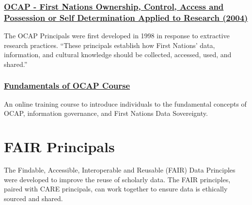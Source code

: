 \documentclass[
]{book}
\begin{document}
\hypertarget{ocap---first-nations-ownership-control-access-and-possession-or-self-determination-applied-to-research-2004}{%
\subsubsection*{\texorpdfstring{\href{https://biblio.uottawa.ca/sites/biblio.uottawa.ca/files/bestpractices_fnigc_ocap_fact_sheet_en_final.pdf}{OCAP - First Nations Ownership, Control, Access and Possession or Self Determination Applied to Research (2004)}}{OCAP - First Nations Ownership, Control, Access and Possession or Self Determination Applied to Research (2004)}}\label{ocap---first-nations-ownership-control-access-and-possession-or-self-determination-applied-to-research-2004}}

The OCAP Principals were first developed in 1998 in response to extractive research practices. ``These principals establish how First Nations' data, information, and cultural knowledge should be collected, accessed, used, and shared.''

\hypertarget{fundamentals-of-ocap-course}{%
\subsubsection*{\texorpdfstring{\href{https://fnigc.ca/ocap-training/take-the-course/}{Fundamentals of OCAP Course}}{Fundamentals of OCAP Course}}\label{fundamentals-of-ocap-course}}

An online training course to introduce individuals to the fundamental concepts of OCAP, information governance, and First Nations Data Sovereignty.

\hypertarget{fair-principals}{%
\section{FAIR Principals}\label{fair-principals}}

The Findable, Accessible, Interoperable and Reusable (FAIR) Data Principles were developed to improve the reuse of scholarly data. The FAIR principles, paired with CARE principals, can work together to ensure data is ethically sourced and shared.
\end{document}
